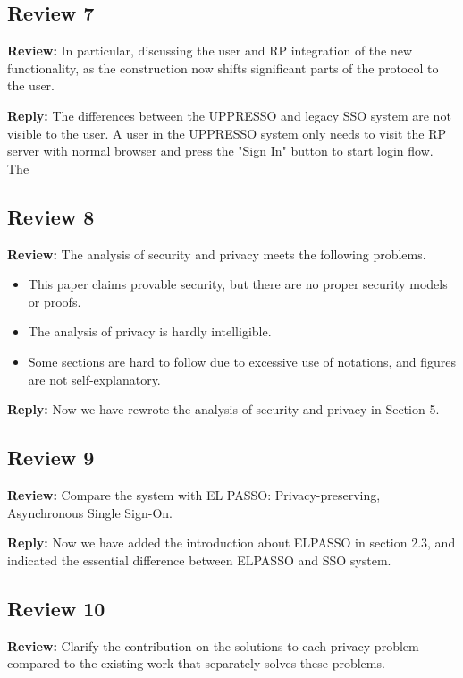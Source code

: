 \documentclass[letterpaper,onecolumn,10pt]{article}
\begin{document}
\subsection*{Review 7}
\vspace{1mm}\noindent\textbf{Review:}
In particular, discussing the user and RP integration of the new functionality, as the construction now shifts significant parts of the protocol to the user.

\vspace{1mm}\noindent\textbf{Reply:}
The differences between the UPPRESSO and legacy SSO system are not visible to the user.
A user in the UPPRESSO system only needs to visit the RP server with normal browser and press the "Sign In" button to start login flow.
The

\subsection*{Review 8}
\vspace{1mm}\noindent\textbf{Review:}
The analysis of security and privacy meets the following problems.
\begin{itemize}
 \item This paper claims provable security, but there are no proper security models or proofs.
 \item The analysis of privacy is hardly intelligible.
 \item Some sections are hard to follow due to excessive use of notations, and figures are not self-explanatory.
\end{itemize}

\vspace{1mm}\noindent\textbf{Reply:}
Now we have rewrote the analysis of security and privacy in Section 5.

\subsection*{Review 9}
\vspace{1mm}\noindent\textbf{Review:}
Compare the system with EL PASSO: Privacy-preserving, Asynchronous Single Sign-On.

\vspace{1mm}\noindent\textbf{Reply:}
Now we have added the introduction about ELPASSO in section 2.3, and indicated the essential difference between ELPASSO and SSO system.


\subsection*{Review 10}
\vspace{1mm}\noindent\textbf{Review:}
Clarify the contribution on the solutions to each privacy problem compared to the existing work that separately solves these problems.
\end{document}

